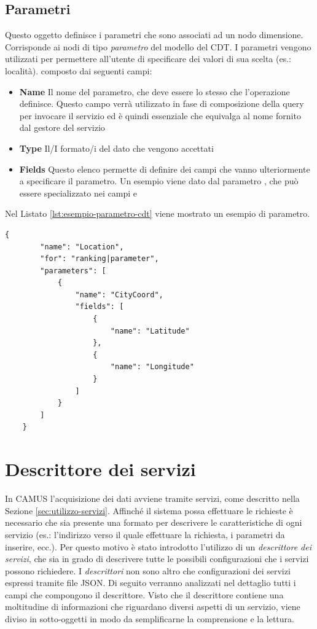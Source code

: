 \subsection{Parametri\label{sec:parametro-cdt}}

Questo oggetto definisce i parametri che sono associati ad un nodo dimensione. Corrisponde ai nodi di tipo \emph{parametro} del modello del CDT. I parametri vengono utilizzati per permettere all'utente di specificare dei valori di sua scelta (es.: località). \upe composto dai seguenti campi:

\begin{itemize}
	\item \textbf{Name} Il nome del parametro, che deve essere lo stesso che l'operazione definisce. Questo campo verrà utilizzato in fase di composizione della query per invocare il servizio ed è quindi essenziale che equivalga al nome fornito dal gestore del servizio
	\item \textbf{Type} Il/I formato/i del dato che vengono accettati
	\item \textbf{Fields} Questo elenco permette di definire dei campi che vanno ulteriormente a specificare il parametro. Un esempio viene dato dal parametro , che può essere specializzato nei campi  e 
\end{itemize}

Nel Listato \ref{lst:esempio-parametro-cdt} viene mostrato un esempio di parametro.

\begin{lstlisting}[style=blocco-esempi,
								caption=Esempio di parametro associato ad un nodo,
								label=lst:esempio-parametro-cdt]
	{
		"name": "Location",
		"for": "ranking|parameter",
		"parameters": [
			{
				"name": "CityCoord",
				"fields": [
					{
						"name": "Latitude"
					},
					{
						"name": "Longitude"
					}
				]
			}
		]
	}
\end{lstlisting}

\section{Descrittore dei servizi\label{sec:descrittore-servizi}}

In CAMUS l'acquisizione dei dati avviene tramite servizi, come descritto nella Sezione \ref{sec:utilizzo-servizi}. Affinché il sistema possa effettuare le richieste è necessario che sia presente una formato per descrivere le caratteristiche di ogni servizio (es.: l'indirizzo verso il quale effettuare la richiesta, i parametri da inserire, ecc.). Per questo motivo è stato introdotto l'utilizzo di un \emph{descrittore dei servizi}, che sia in grado di descrivere tutte le possibili configurazioni che i servizi possono richiedere. I \emph{descrittori} non sono altro che configurazioni dei servizi espressi tramite file JSON. Di seguito verranno analizzati nel dettaglio tutti i campi che compongono il descrittore. Visto che il descrittore contiene una moltitudine di informazioni che riguardano diversi aspetti di un servizio, viene diviso in sotto-oggetti in modo da semplificarne la comprensione e la lettura.

